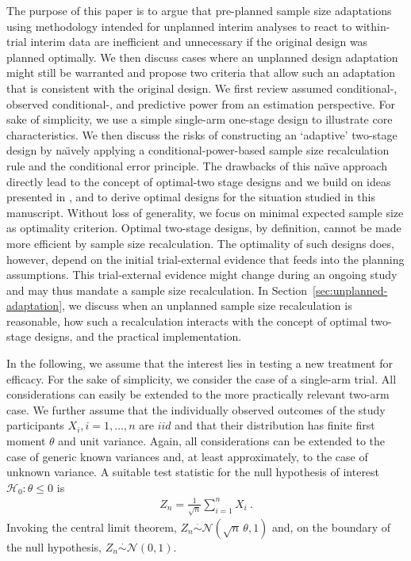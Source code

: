 \documentclass{article}
\begin{document}
The purpose of this paper is to argue that pre-planned sample size adaptations
using methodology intended for unplanned interim analyses to react to within-trial interim data are inefficient and unnecessary if the original design was planned optimally. 
We then discuss cases where an unplanned design adaptation might still be warranted and propose two criteria that allow such an adaptation that is
consistent with the original design.
We first review assumed \mbox{conditional-,} observed \mbox{conditional-,} and predictive power 
from an estimation perspective.
For sake of simplicity, 
we use a simple single-arm one-stage design to illustrate core 
characteristics.
We then discuss the risks of constructing an 
`adaptive' two-stage design by na\"{\i}vely applying
a conditional-power-based sample size recalculation rule and the
conditional error principle.
The drawbacks of this na\"{\i}ve approach directly lead to the
concept of optimal-two stage designs and 
we build on ideas presented in \cite{brannath2004,pilz2019}, and
\cite{adoptrjss2020} to derive optimal designs for the situation studied in
this manuscript.
Without loss of generality, we focus on minimal expected sample size as optimality criterion.
Optimal two-stage designs, by definition, cannot be made more
efficient by sample size recalculation.
The optimality of such designs does, however, depend on the initial trial-external evidence that feeds into the planning assumptions.
This trial-external evidence might change during an ongoing study 
and may thus mandate a sample size recalculation.
In Section~\ref{sec:unplanned-adaptation}, 
we discuss when an unplanned sample size recalculation is 
reasonable, 
how such a recalculation interacts with the concept of 
optimal two-stage designs,
and the practical implementation.

In the following, 
we assume that the interest lies in testing a new treatment for efficacy.
For the sake of simplicity,
we consider the case of a single-arm trial.
All considerations can easily be extended to the more 
practically relevant two-arm case. 
We further assume that the individually observed outcomes of the study participants $X_i, i = 1,\ldots,n$ are $iid$ and that their distribution has finite first moment $\theta$ and unit variance.
Again, all considerations can be extended to the case of 
generic known variances and, 
at least approximately, to the case of unknown variance. 
A suitable test statistic for the null hypothesis of interest~${\mathcal{H}_0:\theta\leq0}$ is
\begin{align}
    Z_n = \frac{1}{\sqrt{n}} \sum_{i=1}^n X_i \ .
\end{align}
Invoking the central limit theorem,
$Z_n\stackrel{\cdot}{\sim}\mathcal{N}(\sqrt{n}\,\theta, 1)$
and, 
on the boundary of the null hypothesis, $Z_n\stackrel{\cdot}{\sim}\mathcal{N}(0, 1)$.
\end{document}
